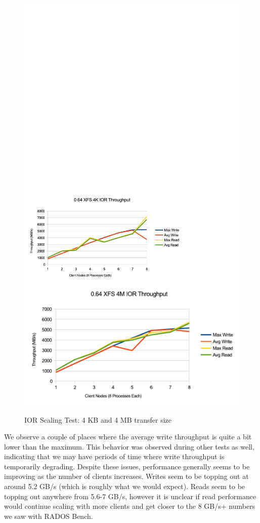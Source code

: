 \documentclass{article}
\begin{document}
\begin{figure}[htb]
\centering
\includegraphics[width=5in]{ior-064-4k}
\includegraphics[width=5in]{ior-064-4m}
\caption{IOR Scaling Test: 4 KB and 4 MB transfer size}
\label{fig:ior-064}
\end{figure}

We observe a couple of places where the average write throughput is quite a
bit lower than the maximum.  This behavior was observed during other tests as well,
indicating that we may have periods of time where write throughput is
temporarily degrading.  Despite these issues, performance generally seems to be
improving as the number of clients increases.  Writes seem to be topping out at
around 5.2 GB/s (which is roughly what we would expect).  Reads seem to be
topping out anywhere from 5.6-7 GB/s, however it is unclear if read performance
would continue scaling with more clients and get closer to the 8 GB/s+ numbers we
saw with RADOS Bench.
\end{document}
